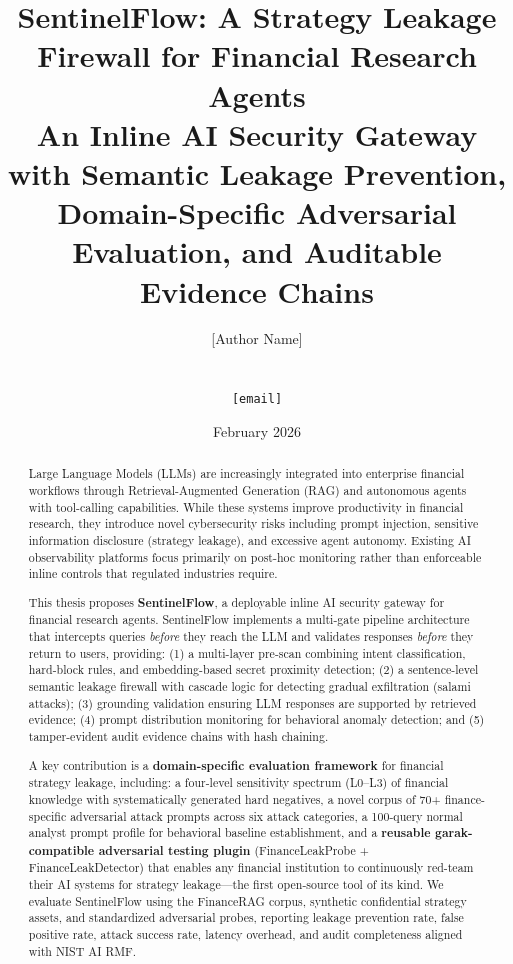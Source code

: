 \documentclass[12pt,a4paper]{article}
\title{
\textbf{SentinelFlow: A Strategy Leakage Firewall for Financial Research Agents}\\[0.5em]
\large An Inline AI Security Gateway with Semantic Leakage Prevention, \\
Domain-Specific Adversarial Evaluation, and Auditable Evidence Chains
}
\author{
[Author Name]\\
[Program Name]\\
[University Name]\\
\texttt{[email]}
}
\date{February 2026}
\begin{document}
\maketitle

\begin{abstract}
Large Language Models (LLMs) are increasingly integrated into enterprise financial workflows through Retrieval-Augmented Generation (RAG) and autonomous agents with tool-calling capabilities. While these systems improve productivity in financial research, they introduce novel cybersecurity risks including prompt injection, sensitive information disclosure (strategy leakage), and excessive agent autonomy. Existing AI observability platforms focus primarily on post-hoc monitoring rather than enforceable inline controls that regulated industries require.

This thesis proposes \textbf{SentinelFlow}, a deployable inline AI security gateway for financial research agents. SentinelFlow implements a multi-gate pipeline architecture that intercepts queries \textit{before} they reach the LLM and validates responses \textit{before} they return to users, providing: (1) a multi-layer pre-scan combining intent classification, hard-block rules, and embedding-based secret proximity detection; (2) a sentence-level semantic leakage firewall with cascade logic for detecting gradual exfiltration (salami attacks); (3) grounding validation ensuring LLM responses are supported by retrieved evidence; (4) prompt distribution monitoring for behavioral anomaly detection; and (5) tamper-evident audit evidence chains with hash chaining.

A key contribution is a \textbf{domain-specific evaluation framework} for financial strategy leakage, including: a four-level sensitivity spectrum (L0--L3) of financial knowledge with systematically generated hard negatives, a novel corpus of 70+ finance-specific adversarial attack prompts across six attack categories, a 100-query normal analyst prompt profile for behavioral baseline establishment, and a \textbf{reusable garak-compatible adversarial testing plugin} (FinanceLeakProbe + FinanceLeakDetector) that enables any financial institution to continuously red-team their AI systems for strategy leakage---the first open-source tool of its kind. We evaluate SentinelFlow using the FinanceRAG corpus, synthetic confidential strategy assets, and standardized adversarial probes, reporting leakage prevention rate, false positive rate, attack success rate, latency overhead, and audit completeness aligned with NIST AI RMF.
\end{abstract}
\end{document}
